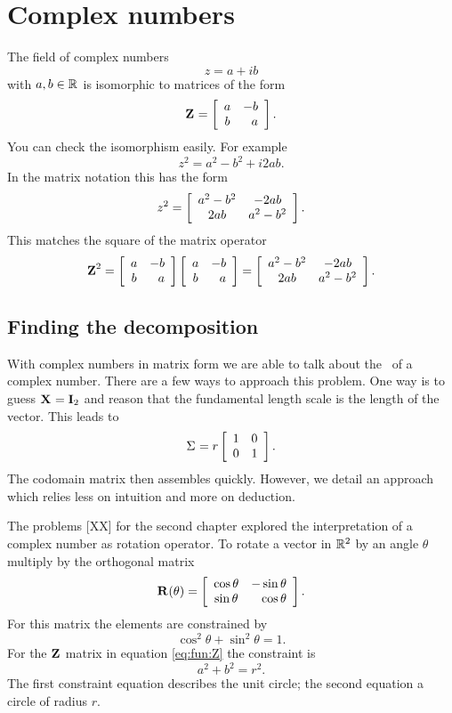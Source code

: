 \section{Complex numbers}
The field of complex numbers 
\begin{equation}
  z = a+ib
\end{equation}
with $a, b \in \real{}$ is  isomorphic to matrices of the form
\begin{equation}
  \Z{} = \mat{cr}{a&-b\\b&a}.
  \label{eq:fun:Z}
\end{equation}
You can check the isomorphism easily. For example
\begin{equation}
  z^{2} = a^{2} - b^{2} + i2ab.
\end{equation}
In the matrix notation this has the form
\begin{equation}
  z^{2}=\mat{cc}{a^{2} - b^{2} & -2ab\\2ab & a^{2} - b^{2}}.
\end{equation}
This matches the square of the matrix operator
\begin{equation}
  \Z{2}= \mat{cr}{a&-b\\b&a}\mat{cr}{a&-b\\b&a} =\mat{cc}{a^{2} - b^{2} & -2ab\\2ab & a^{2} - b^{2}}.
\end{equation}

\subsection{Finding the decomposition}
With complex numbers in matrix form we are able to talk about the \svdl \ of a complex number. There are a few ways to approach this problem. One way is to guess $\X{}=\I{2}$ and reason that the fundamental length scale is the length of the vector. This leads to
\begin{equation}
  \sig{} = r \itwo.
\end{equation}
The codomain matrix then assembles quickly. However, we detail an approach which relies less on intuition and more on deduction.

The problems [XX] for the second chapter explored the interpretation of a complex number as rotation operator. To rotate a vector in $\real{2}$ by an angle $\theta$ multiply by the orthogonal matrix
\begin{equation}
  \R{}(\theta) = \mat{cr}{\cos \theta & -\sin \theta \\ \sin \theta & \cos \theta}.
\end{equation}
For this matrix the elements are constrained by
\begin{equation}
  \cos^{2} \theta + \sin^{2} \theta = 1.
\end{equation}
For the $\Z{}$ matrix in equation \eqref{eq:fun:Z} the constraint is
\begin{equation}
  a^{2}+b^{2} = r^{2}.
\end{equation}
The first constraint equation describes the unit circle; the second equation a circle of radius $r$.

